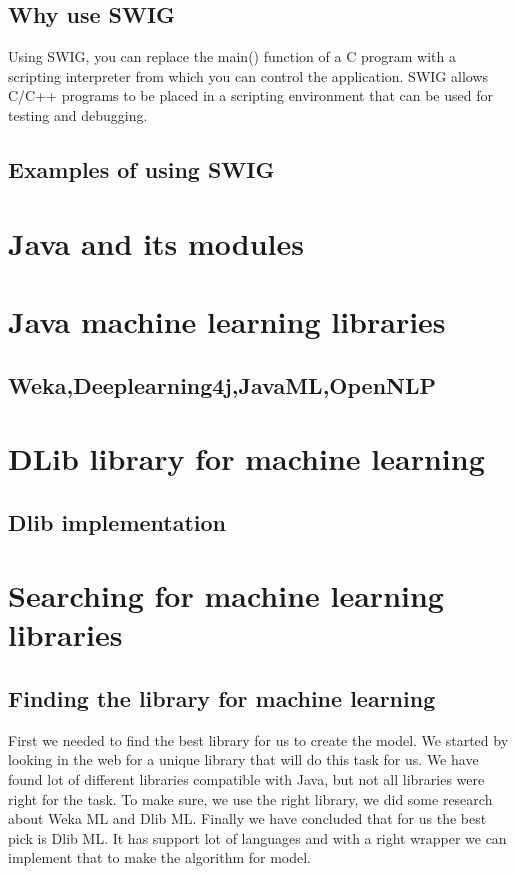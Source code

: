 \documentclass[english,12pt,oneside,a4paper]{article}
\begin{document}
\begin{center}
		\subsection{Why use SWIG}
		Using SWIG, you can replace the main() function of a C program with a scripting interpreter from which you can control the application. SWIG allows C/C++ programs to be placed in a scripting environment that can be used for testing and debugging.
		\subsection{Examples of using SWIG}
		
		\section{Java and its modules}
		
		\section{Java machine learning libraries}
		
		\subsection{Weka,Deeplearning4j,JavaML,OpenNLP}
		
		\section{DLib library for machine learning}
		
		\subsection{Dlib implementation}
		
		\section{Searching for machine learning libraries}
		
		\subsection{Finding the library for machine learning}
		First we needed to find the best library for us to create the model.
		We started by looking in the web for a unique library that will do this task for us. We have found lot of different libraries compatible with Java, but not all libraries were right for the task. To make sure, we use the right library, we did some research about Weka ML and Dlib ML.
		Finally we have concluded that for us the best pick is Dlib ML. It has support lot of languages and with a right wrapper we can implement that to make the algorithm for model.

\end{center}
\end{document}
